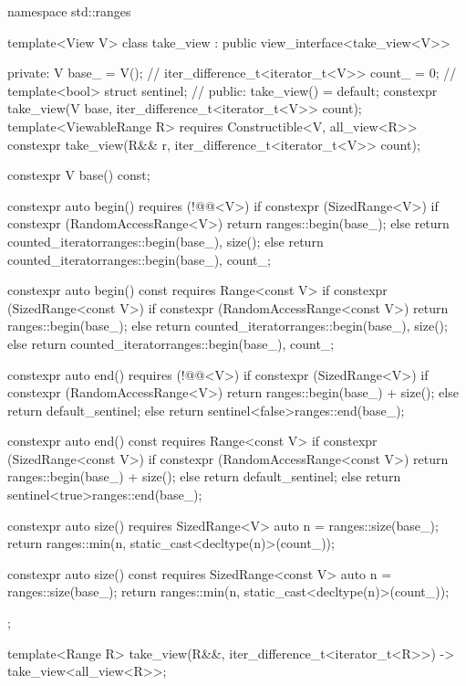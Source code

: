 \begin{codeblock}
namespace std::ranges {
  template<View V>
  class take_view : public view_interface<take_view<V>> {
  private:
    V base_ = V();                                      // \expos
    iter_difference_t<iterator_t<V>> count_ = 0;        // \expos
    template<bool> struct sentinel;                     // \expos
  public:
    take_view() = default;
    constexpr take_view(V base, iter_difference_t<iterator_t<V>> count);
    template<ViewableRange R>
      requires Constructible<V, all_view<R>>
    constexpr take_view(R&& r, iter_difference_t<iterator_t<V>> count);

    constexpr V base() const;

    constexpr auto begin() requires (!@@<V>) {
      if constexpr (SizedRange<V>) {
        if constexpr (RandomAccessRange<V>)
          return ranges::begin(base_);
        else
          return counted_iterator{ranges::begin(base_), size()};
      } else
        return counted_iterator{ranges::begin(base_), count_};
    }

    constexpr auto begin() const requires Range<const V> {
      if constexpr (SizedRange<const V>) {
        if constexpr (RandomAccessRange<const V>)
          return ranges::begin(base_);
        else
          return counted_iterator{ranges::begin(base_), size()};
      } else
        return counted_iterator{ranges::begin(base_), count_};
    }

    constexpr auto end() requires (!@@<V>) {
      if constexpr (SizedRange<V>) {
        if constexpr (RandomAccessRange<V>)
          return ranges::begin(base_) + size();
        else
          return default_sentinel;
      } else
        return sentinel<false>{ranges::end(base_)};
    }

    constexpr auto end() const requires Range<const V> {
      if constexpr (SizedRange<const V>) {
        if constexpr (RandomAccessRange<const V>)
          return ranges::begin(base_) + size();
        else
          return default_sentinel;
      } else
        return sentinel<true>{ranges::end(base_)};
    }

    constexpr auto size() requires SizedRange<V> {
      auto n = ranges::size(base_);
      return ranges::min(n, static_cast<decltype(n)>(count_));
    }

    constexpr auto size() const requires SizedRange<const V> {
      auto n = ranges::size(base_);
      return ranges::min(n, static_cast<decltype(n)>(count_));
    }
  };

  template<Range R>
    take_view(R&&, iter_difference_t<iterator_t<R>>)
      -> take_view<all_view<R>>;
}
\end{codeblock}

